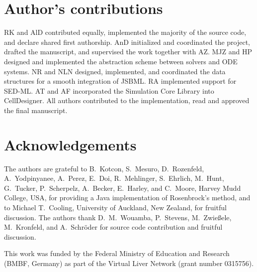 \documentclass[10pt]{bmc_article}
\newenvironment{bmcformat}{\baselineskip20pt\sloppy\setboolean{publ}{false}}{\baselineskip20pt\sloppy}
\begin{document}
\begin{bmcformat}
\section*{Author's contributions}
RK and AlD contributed equally, implemented the majority of the source code, and
declare shared first authorship.
AnD initialized and coordinated the project, drafted the manuscript, and
supervised the work together with AZ.
MJZ and HP designed and implemented the abstraction scheme between solvers and
ODE systems.
NR and NLN designed, implemented, and coordinated the data structures for a
smooth integration of JSBML.
RA implemented support for SED-ML.
AT and AF incorporated the Simulation Core Library into CellDesigner.
All authors contributed to the implementation, read and approved the final
manuscript.
    

\section*{Acknowledgements}
The authors are grateful to B.~Kotcon, S.~Mesuro, D.~Rozenfeld, A.~Yodpinyanee,
A.~Perez, E.~Doi, R.~Mehlinger, S.~Ehrlich, M.~Hunt, G.~Tucker, P.~Scherpelz,
A.~Becker, E.~Harley, and C.~Moore, Harvey Mudd College, USA, for providing a
Java implementation of Rosenbrock's method, and to Michael T.~Cooling,
University of Auckland, New Zealand, for fruitful discussion. The authors thank
D.~M.~Wouamba, P.~Stevens, M.~Zwie\ss{}ele, M.~Kronfeld, and A.~Schr\"oder for
source code contribution and fruitful discussion.

This work was funded by the Federal Ministry of Education and Research (BMBF,
Germany) as part of the Virtual Liver Network (grant number 0315756).
 


\end{bmcformat}
\end{document}
